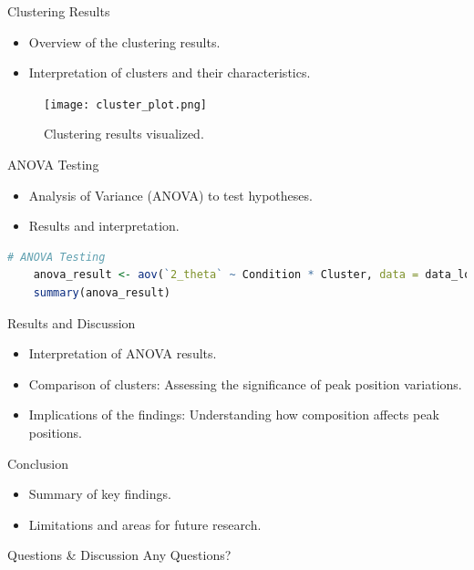 \documentclass{beamer}
\begin{document}
\begin{frame}{Clustering Results}
    \begin{itemize}
        \item Overview of the clustering results.
        \item Interpretation of clusters and their characteristics.
    \end{itemize}

    \begin{figure}
        \texttt{[image: cluster\_plot.png]}
        \caption{Clustering results visualized.}
    \end{figure}
\end{frame}






\begin{frame}[fragile]{ANOVA Testing}
    \begin{itemize}
        \item Analysis of Variance (ANOVA) to test hypotheses.
        \item Results and interpretation.
    \end{itemize}

    \begin{lstlisting}[language=R]
    # ANOVA Testing
    anova_result <- aov(`2_theta` ~ Condition * Cluster, data = data_long)
    summary(anova_result)
    \end{lstlisting}
\end{frame}

\begin{frame}{Results and Discussion}
    \begin{itemize}
        \item Interpretation of ANOVA results.
        \item Comparison of clusters: Assessing the significance of peak position variations.
        \item Implications of the findings: Understanding how composition affects peak positions.
    \end{itemize}
\end{frame}

\begin{frame}{Conclusion}
    \begin{itemize}
        \item Summary of key findings.
        \item Limitations and areas for future research.
    \end{itemize}
\end{frame}

\begin{frame}{Questions \& Discussion}
    \centering
    \Huge Any Questions?
\end{frame}
\end{document}
